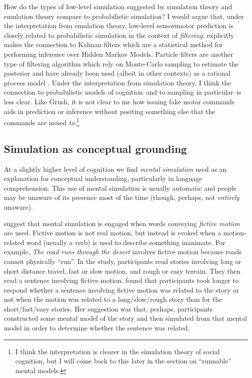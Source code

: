 \documentclass[12pt]{article}
\begin{document}
How do the types of low-level simulation suggested by simulation theory and emulation theory compare to probabilistic simulation? I would argue that, under the interpretation from emulation theory, low-level sensorimotor prediction is closely related to probabilistic simulation in the context of \textit{filtering}. \cite{Grush2004} explicitly makes the connection to Kalman filters which are a statistical method for performing inference over Hidden Markov Models. Particle filters are another type of filtering algorithm which rely on Monte-Carlo sampling to estimate the posterior and have already been used (albeit in other contexts) as a rational process model \citep{Abbott2011}. Under the interpretation from simulation theory, I think the connection to probabilistic models of cognition--and to sampling in particular--is less clear. Like Grush, it is not clear to me how issuing fake motor commands aids in prediction or inference without positing something else that the commands are issued \textit{to}.\footnote{I think the interpretation is clearer in the simulation theory of social cognition, but I will come back to this later in the section on ``runnable'' mental models.}

\subsection*{Simulation as conceptual grounding}

At a slightly higher level of cognition we find \textit{mental simulation} used as an explanation for conceptual understanding, particularly in language comprehension. This use of mental simulation is usually automatic and people may be unaware of its presence most of the time (though, perhaps, not \textit{entirely} unaware).

\cite{Matlock2004} suggest that mental simulation is engaged when words conveying \textit{fictive motion} are used. Fictive motion is not real motion, but instead is evoked when a motion-related word (usually a verb) is used to describe something inanimate. For example, \textit{The road runs through the desert} involves fictive motion because roads cannot physically ``run''. In the study, participants read stories involving long or short distance travel, fast or slow motion, and rough or easy terrain. They then read a sentence involving fictive motion. \cite{Matlock2004} found that participants took longer to respond whether a sentence involving fictive motion was related to the story or not when the motion was related to a long/slow/rough story than for the short/fast/easy stories. Her suggestion was that, perhaps, participants constructed some mental model of the story and then simulated from that mental model in order to determine whether the sentence was related.
\end{document}
